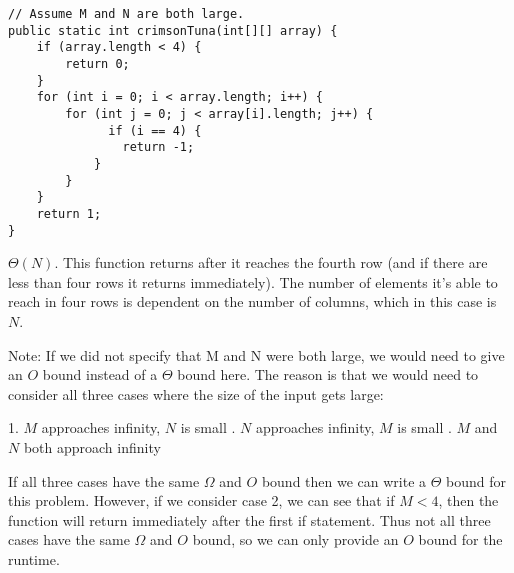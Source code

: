 \begin{blocksection}
\question

\begin{lstlisting}
// Assume M and N are both large.
public static int crimsonTuna(int[][] array) {
    if (array.length < 4) {
        return 0;
    }
    for (int i = 0; i < array.length; i++) {
        for (int j = 0; j < array[i].length; j++) {
              if (i == 4) {
                return -1;
            }
        }
    }
    return 1;
}
\end{lstlisting}
\end{blocksection}

\begin{blocksection}
\begin{solution}
$\Theta(N)$. This function returns after it reaches the fourth row (and if there are
less than four rows it returns immediately). The number of elements it's able
to reach in four rows is dependent on the number of columns, which in this case
is $N$. \newline

Note: If we did not specify that M and N were both large, we would need to give an
$O$ bound instead of a $\Theta$ bound here. The reason is that we would need to
consider all three cases where the size of the input gets large: \newline 

1. $M$ approaches infinity, $N$ is small . $N$ approaches infinity, $M$ is small . $M$ and $N$ both approach infinity \newline

If all three cases have the same $\Omega$ and $O$ bound then we can write a
$\Theta$ bound for this problem. However, if we consider case 2, we can see
that if $M < 4$, then the function will return immediately after the first
if statement. Thus not all three cases have the same  $\Omega$ and $O$ bound,
so we can only provide an $O$ bound for the runtime.
\end{solution}
\end{blocksection}
